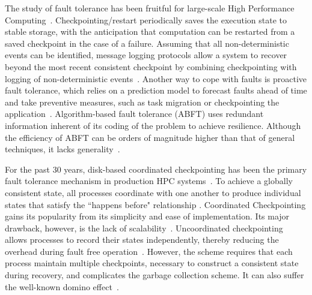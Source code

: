 
The study of fault tolerance has been fruitful for large-scale High Performance Computing~\cite{herault2015fault}. Checkpointing/restart periodically saves the execution state to stable storage, with the anticipation that
computation can be restarted from a saved checkpoint in the case of a failure. 
Assuming that all non-deterministic events can be identified, message logging protocols allow a system to recover beyond the most recent consistent checkpoint by combining checkpointing with logging of non-deterministic events~\cite{Elnozahy:02:Survey}. Another way to cope with faults is proactive fault tolerance, which relies on a prediction model to forecast faults ahead of time and take preventive measures, such as task migration or checkpointing the application~\cite{chakravorty2006proactive,gainaru2012fault}. Algorithm-based fault tolerance (ABFT) uses redundant information inherent of its coding of the problem to achieve resilience. Although the efficiency of ABFT can be orders of magnitude higher than that of general techniques, it lacks generality~\cite{herault2015fault}.

For the past 30 years, disk-based coordinated checkpointing has been the primary fault tolerance mechanism in 
production HPC systems~\cite{ferreira_sc_2011}. 
To achieve a globally consistent state, all processes
coordinate with one another to produce individual states that satisfy the ``happens before" relationship \cite{chandy_trans_1972}.
Coordinated Checkpointing gains its popularity from its simplicity and ease of implementation. Its major drawback, however, is the
lack of scalability~\cite{hargrove2006berkeley}.
Uncoordinated checkpointing allows processes to record their states independently, thereby reducing the overhead during fault free operation~\cite{guermouche_2011_ipdps}. 
However, the scheme requires that
each process maintain multiple checkpoints, necessary to construct a consistent state during recovery, and complicates the garbage collection scheme. It can also suffer the well-known domino effect~\cite{randell_domino_effect}. %


